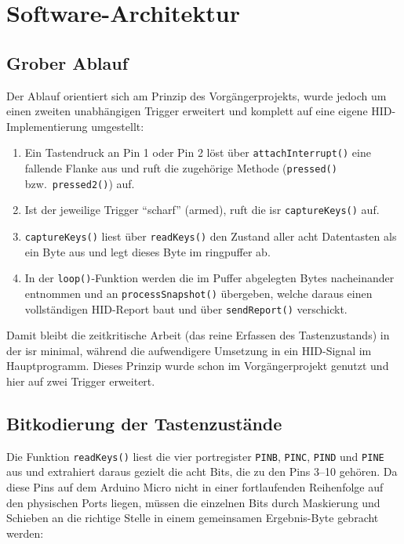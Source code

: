\documentclass{article}
\begin{document}
\FloatBarrier

\section{Software-Architektur}

\subsection{Grober Ablauf}
Der Ablauf orientiert sich am Prinzip des Vorgängerprojekts, wurde jedoch um einen zweiten unabhängigen Trigger erweitert und komplett auf eine eigene HID-Implementierung umgestellt:

\begin{enumerate}
    \item Ein Tastendruck an Pin 1 oder Pin 2 löst über \texttt{attachInterrupt()} eine fallende Flanke aus und ruft die zugehörige Methode (\texttt{pressed()} bzw.\ \texttt{pressed2()}) auf.
    \item Ist der jeweilige Trigger \enquote{scharf} (armed), ruft die \gls{isr} \texttt{captureKeys()} auf.
    \item \texttt{captureKeys()} liest über \texttt{readKeys()} den Zustand aller acht Datentasten als ein Byte aus und legt dieses Byte im \gls{ringpuffer} ab.
    \item In der \texttt{loop()}-Funktion werden die im Puffer abgelegten Bytes nacheinander entnommen und an \texttt{processSnapshot()} übergeben, welche daraus einen vollständigen HID-Report baut und über \texttt{sendReport()} verschickt.
\end{enumerate}

Damit bleibt die zeitkritische Arbeit (das reine Erfassen des Tastenzustands) in der \gls{isr} minimal, während die aufwendigere Umsetzung in ein HID-Signal im Hauptprogramm. Dieses Prinzip wurde schon im Vorgängerprojekt genutzt und hier auf zwei Trigger erweitert.

\subsection{Bitkodierung der Tastenzustände}
Die Funktion \texttt{readKeys()} liest die vier \gls{portregister} \texttt{PINB}, \texttt{PINC}, \texttt{PIND} und \texttt{PINE} aus und extrahiert daraus gezielt die acht Bits, die zu den Pins 3--10 gehören. Da diese Pins auf dem Arduino Micro nicht in einer fortlaufenden Reihenfolge auf den physischen Ports liegen, müssen die einzelnen Bits durch Maskierung und Schieben an die richtige Stelle in einem gemeinsamen Ergebnis-Byte gebracht werden:
\end{document}
